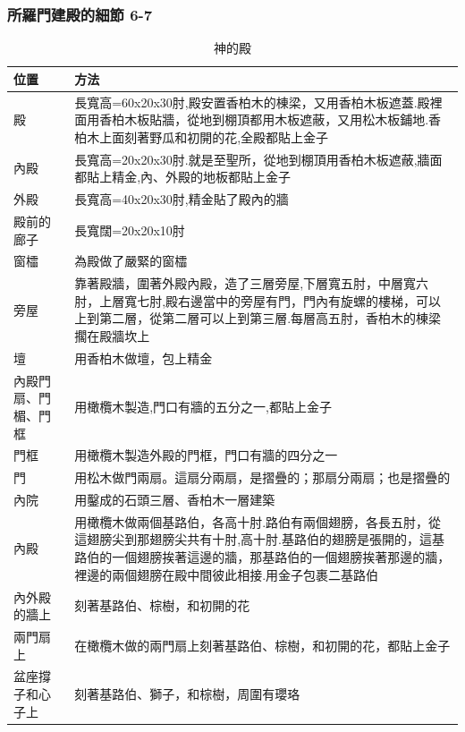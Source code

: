 \subsubsection{所羅門建殿的細節 6-7 }
\begin{table}[H]\centering
\begin{tabular}{p{2cm}|p{}}\hline\hline
位置      &方法    \\\hline\hline
 殿   & 長寬高=60x20x30肘,殿安置香柏木的棟梁，又用香柏木板遮蓋.殿裡面用香柏木板貼牆，從地到棚頂都用木板遮蔽，又用松木板鋪地.香柏木上面刻著野瓜和初開的花,全殿都貼上金子\\\hline
 內殿& 長寬高=20x20x30肘.就是至聖所，從地到棚頂用香柏木板遮蔽,牆面都貼上精金,內、外殿的地板都貼上金子\\\hline
 外殿& 長寬高=40x20x30肘,精金貼了殿內的牆\\\hline
殿前的廊子   & 長寬闊=20x20x10肘  \\\hline
窗櫺    & 為殿做了嚴緊的窗櫺\\\hline
旁屋& 靠著殿牆，圍著外殿內殿，造了三層旁屋,下層寬五肘，中層寬六肘，上層寬七肘,殿右邊當中的旁屋有門，門內有旋螺的樓梯，可以上到第二層，從第二層可以上到第三層.每層高五肘，香柏木的棟梁擱在殿牆坎上\\\hline
壇& 用香柏木做壇，包上精金 \\\hline
內殿門扇、門楣、門框& 用橄欖木製造,門口有牆的五分之一,都貼上金子 \\\hline
門框& 用橄欖木製造外殿的門框，門口有牆的四分之一\\\hline
門& 用松木做門兩扇。這扇分兩扇，是摺疊的；那扇分兩扇；也是摺疊的\\\hline
內院& 用鑿成的石頭三層、香柏木一層建築\\\hline
 內殿    & 用橄欖木做兩個基路伯，各高十肘.路伯有兩個翅膀，各長五肘，從這翅膀尖到那翅膀尖共有十肘,高十肘.基路伯的翅膀是張開的，這基路伯的一個翅膀挨著這邊的牆，那基路伯的一個翅膀挨著那邊的牆，裡邊的兩個翅膀在殿中間彼此相接.用金子包裹二基路伯    \\\hline
內外殿的牆上   & 刻著基路伯、棕樹，和初開的花   \\\hline
兩門扇上   & 在橄欖木做的兩門扇上刻著基路伯、棕樹，和初開的花，都貼上金子\\\hline
盆座撐子和心子上 & 刻著基路伯、獅子，和棕樹，周圍有瓔珞\\\hline
\end{tabular}
\caption{神的殿}
\end{table}

